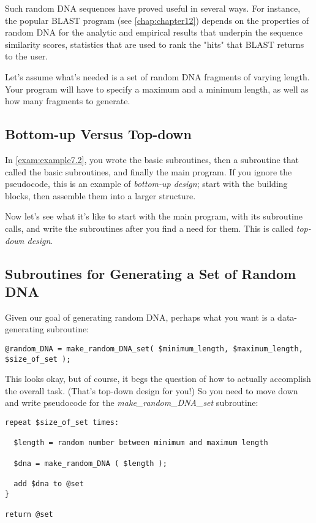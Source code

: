 Such random DNA sequences have proved useful in several ways. For instance, the popular BLAST program (see \autoref{chap:chapter12}) depends on the properties of random DNA for the analytic and empirical results that underpin the sequence similarity scores, statistics that are used to rank the "hits" that BLAST returns to the user.

Let's assume what's needed is a set of random DNA fragments of varying length. Your program will have to specify a maximum and a minimum length, as well as how many fragments to generate. 

\subsection{Bottom-up Versus Top-down}
In \autoref{exam:example7.2}, you wrote the basic subroutines, then a subroutine that called the basic subroutines, and finally the main program. If you ignore the pseudocode, this is an example of \textit{bottom-up design}; start with the building blocks, then assemble them into a larger structure.

Now let's see what it's like to start with the main program, with its subroutine calls, and write the subroutines after you find a need for them. This is called \textit{top-down design}.

\subsection{Subroutines for Generating a Set of Random DNA}
Given our goal of generating random DNA, perhaps what you want is a data-generating subroutine:

\begin{lstlisting}
@random_DNA = make_random_DNA_set( $minimum_length, $maximum_length, $size_of_set );
\end{lstlisting}

This looks okay, but of course, it begs the question of how to actually accomplish the overall task. (That's top-down design for you!) So you need to move down and write pseudocode for the \textit{make\_random\_DNA\_set} subroutine: 

\begin{lstlisting}
repeat $size_of_set times:

  $length = random number between minimum and maximum length

  $dna = make_random_DNA ( $length );

  add $dna to @set
}

return @set
\end{lstlisting}

